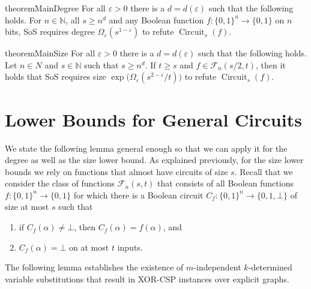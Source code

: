 \documentclass[10pt,a4paper]{article}
\theoremstyle{plain}
\theoremstyle{remark}
\theoremstyle{definition}
\newcommand{\eps}{\varepsilon}
\newcommand{\set}[1]{\{#1\}}
\newcommand{\calF}{\mathcal{F}}
\newcommand{\N}{\mathbb{N}}
\DeclareMathOperator{\circuit}{Circuit}
\begin{document}
\begin{restatable}{theorem}{MainDegree}
  \label{thm:main-degree}
  For all $\eps > 0$ there is a $d = d(\eps)$ such that the following
  holds.  For $n \in \N$, all $s \ge n^{d}$ and any Boolean function
  $f:\set{0,1}^{n} \rightarrow \set{0,1}$ on $n$ bits, SoS requires
  degree $\Omega_\eps(s^{1-\eps})$ to refute $\circuit_s(f)$.
\end{restatable}

\begin{restatable}{theorem}{MainSize}
  \label{thm:main-size}
  For all $\eps > 0$ there is a $d = d(\eps)$ such that the following
  holds. Let $n \in N$ and $s \in \N$ such that $s \ge n^d$. If
  $t \ge s$ and $f \in \calF_n(s/2, t)$, then it holds that SoS
  requires size $\exp\big(\Omega_\eps(s^{2-\eps}/t)\big)$ to refute
  $\circuit_s(f)$.
\end{restatable}

\section{Lower Bounds for General Circuits}
\label{sec:demorgan-LB}

We state the following lemma general enough so that we can apply it
for the degree as well as the size lower bound. As explained
previously, for the size lower bounds we rely on functions that almost
have circuits of size $s$. Recall that we consider the class of
functions $\calF_n(s,t)$ that consists of all Boolean functions
$f: \set{0,1}^n \rightarrow \set{0,1}$ for which there is a Boolean
circuit $C_f: \set{0,1}^n \rightarrow \set{0, 1, \bot}$ of size at most
$s$ such that
\begin{enumerate}
\item if $C_f(\alpha) \neq \bot$, then $C_f(\alpha) = f(\alpha)$, and
\item $C_f(\alpha) = \bot$ on at most $t$ inputs.
\end{enumerate}
The following lemma establishes the existence of $m$-independent
$k$-deter\-mined variable substitutions that result in XOR-CSP instances
over explicit graphs.
\end{document}
